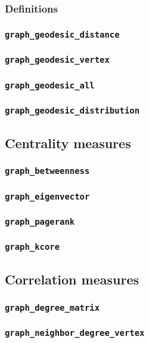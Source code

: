 \documentclass[a4paper,10pt]{article}
\begin{document}
\subsubsection{Definitions}
\subsubsection{\texttt{graph\_geodesic\_distance}}
\subsubsection{\texttt{graph\_geodesic\_vertex}}
\subsubsection{\texttt{graph\_geodesic\_all}}
\subsubsection{\texttt{graph\_geodesic\_distribution}}

\subsection{Centrality measures}
\subsubsection{\texttt{graph\_betweenness}}
\subsubsection{\texttt{graph\_eigenvector}}
\subsubsection{\texttt{graph\_pagerank}}
\subsubsection{\texttt{graph\_kcore}}

\subsection{Correlation measures}
\subsubsection{\texttt{graph\_degree\_matrix}}
\subsubsection{\texttt{graph\_neighbor\_degree\_vertex}}
\end{document}
